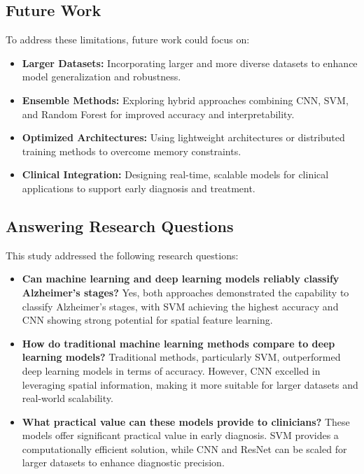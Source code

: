 \documentclass[runningheads]{llncs}
\begin{document}
\subsection{Future Work}

To address these limitations, future work could focus on:
\begin{itemize}
    \item \textbf{Larger Datasets:} Incorporating larger and more diverse datasets to enhance model generalization and robustness.
    \item \textbf{Ensemble Methods:} Exploring hybrid approaches combining CNN, SVM, and Random Forest for improved accuracy and interpretability.
    \item \textbf{Optimized Architectures:} Using lightweight architectures or distributed training methods to overcome memory constraints.
    \item \textbf{Clinical Integration:} Designing real-time, scalable models for clinical applications to support early diagnosis and treatment.
\end{itemize}

\subsection{Answering Research Questions}

This study addressed the following research questions:
\begin{itemize}
    \item \textbf{Can machine learning and deep learning models reliably classify Alzheimer’s stages?} Yes, both approaches demonstrated the capability to classify Alzheimer’s stages, with SVM achieving the highest accuracy and CNN showing strong potential for spatial feature learning.
    \item \textbf{How do traditional machine learning methods compare to deep learning models?} Traditional methods, particularly SVM, outperformed deep learning models in terms of accuracy. However, CNN excelled in leveraging spatial information, making it more suitable for larger datasets and real-world scalability.
    \item \textbf{What practical value can these models provide to clinicians?} These models offer significant practical value in early diagnosis. SVM provides a computationally efficient solution, while CNN and ResNet can be scaled for larger datasets to enhance diagnostic precision.
\end{itemize}
\end{document}
